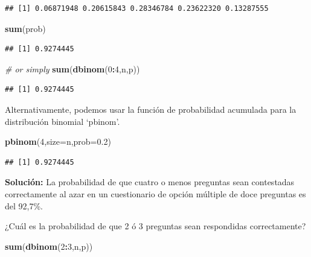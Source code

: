 \documentclass[]{book}
\newenvironment{Shaded}{\begin{snugshade}}{\end{snugshade}}
\newcommand{\KeywordTok}[1]{\textcolor[rgb]{0.13,0.29,0.53}{\textbf{#1}}}
\newcommand{\DataTypeTok}[1]{\textcolor[rgb]{0.13,0.29,0.53}{#1}}
\newcommand{\DecValTok}[1]{\textcolor[rgb]{0.00,0.00,0.81}{#1}}
\newcommand{\FloatTok}[1]{\textcolor[rgb]{0.00,0.00,0.81}{#1}}
\newcommand{\CommentTok}[1]{\textcolor[rgb]{0.56,0.35,0.01}{\textit{#1}}}
\newcommand{\OperatorTok}[1]{\textcolor[rgb]{0.81,0.36,0.00}{\textbf{#1}}}
\newcommand{\NormalTok}[1]{#1}
\begin{document}
\begin{verbatim}
## [1] 0.06871948 0.20615843 0.28346784 0.23622320 0.13287555
\end{verbatim}

\begin{Shaded}
\begin{Highlighting}[]
\KeywordTok{sum}\NormalTok{(prob)}
\end{Highlighting}
\end{Shaded}

\begin{verbatim}
## [1] 0.9274445
\end{verbatim}

\begin{Shaded}
\begin{Highlighting}[]
\CommentTok{# or simply}
\KeywordTok{sum}\NormalTok{(}\KeywordTok{dbinom}\NormalTok{(}\DecValTok{0}\OperatorTok{:}\DecValTok{4}\NormalTok{,n,p))}
\end{Highlighting}
\end{Shaded}

\begin{verbatim}
## [1] 0.9274445
\end{verbatim}

Alternativamente, podemos usar la función de probabilidad acumulada para
la distribución binomial `pbinom'.

\begin{Shaded}
\begin{Highlighting}[]
\KeywordTok{pbinom}\NormalTok{(}\DecValTok{4}\NormalTok{,}\DataTypeTok{size=}\NormalTok{n,}\DataTypeTok{prob=}\FloatTok{0.2}\NormalTok{)}
\end{Highlighting}
\end{Shaded}

\begin{verbatim}
## [1] 0.9274445
\end{verbatim}

\textbf{Solución:} La probabilidad de que cuatro o menos preguntas sean
contestadas correctamente al azar en un cuestionario de opción múltiple
de doce preguntas es del 92,7\%.

¿Cuál es la probabilidad de que 2 ó 3 preguntas sean respondidas
correctamente?

\begin{Shaded}
\begin{Highlighting}[]
\KeywordTok{sum}\NormalTok{(}\KeywordTok{dbinom}\NormalTok{(}\DecValTok{2}\OperatorTok{:}\DecValTok{3}\NormalTok{,n,p))}
\end{Highlighting}
\end{Shaded}
\end{document}
